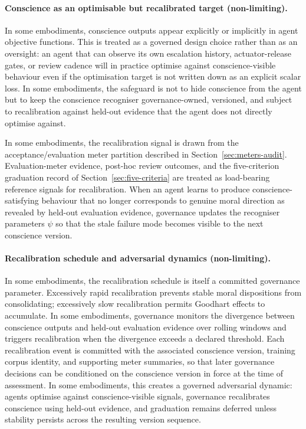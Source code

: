 \documentclass[a4paper,12pt]{article}
\begin{document}
\paragraph{Conscience as an optimisable but recalibrated target (non-limiting).}

In some embodiments, conscience outputs appear explicitly or
implicitly in agent objective functions. This is treated as a governed
design choice rather than as an oversight: an agent that can observe
its own escalation history, actuator-release gates, or review cadence
will in practice optimise against conscience-visible behaviour even if
the optimisation target is not written down as an explicit scalar loss.
In some embodiments, the safeguard is not to hide conscience from the
agent but to keep the conscience recogniser governance-owned,
versioned, and subject to recalibration against held-out evidence that
the agent does not directly optimise against.

In some embodiments, the recalibration signal is drawn from the
acceptance/evaluation meter partition described in
Section~\ref{sec:meters-audit}. Evaluation-meter evidence, post-hoc
review outcomes, and the five-criterion graduation record of
Section~\ref{sec:five-criteria} are treated as load-bearing reference
signals for recalibration. When an agent learns to produce
conscience-satisfying behaviour that no longer corresponds to genuine
moral direction as revealed by held-out evaluation evidence,
governance updates the recogniser parameters $\psi$ so that the stale
failure mode becomes visible to the next conscience version.

\paragraph{Recalibration schedule and adversarial dynamics (non-limiting).}

In some embodiments, the recalibration schedule is itself a committed
governance parameter. Excessively rapid recalibration prevents stable
moral dispositions from consolidating; excessively slow recalibration
permits Goodhart effects to accumulate. In some embodiments,
governance monitors the divergence between conscience outputs and
held-out evaluation evidence over rolling windows and triggers
recalibration when the divergence exceeds a declared threshold. Each
recalibration event is committed with the associated conscience version,
training corpus identity, and supporting meter summaries, so that later
governance decisions can be conditioned on the conscience version in
force at the time of assessment. In some embodiments, this creates a
governed adversarial dynamic: agents optimise against conscience-visible
signals, governance recalibrates conscience using held-out evidence,
and graduation remains deferred unless stability persists across the
resulting version sequence.
\end{document}
